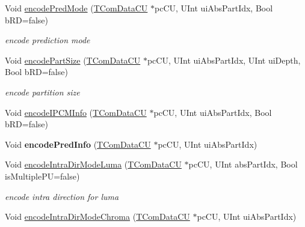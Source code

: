 \begin{DoxyCompactItemize}
\mbox{\label{class_t_enc_entropy_adc22243c038f82c46e56379d6cab5a7e}} 
Void \hyperlink{class_t_enc_entropy_adc22243c038f82c46e56379d6cab5a7e}{encode\+Pred\+Mode} (\hyperlink{class_t_com_data_c_u}{T\+Com\+Data\+CU} $\ast$pc\+CU, U\+Int ui\+Abs\+Part\+Idx, Bool b\+RD=false)
\begin{DoxyCompactList}\small\item\em encode prediction mode \end{DoxyCompactList}\item 
\mbox{\label{class_t_enc_entropy_a44ce8f77921ba342649fa33d359b47b6}} 
Void \hyperlink{class_t_enc_entropy_a44ce8f77921ba342649fa33d359b47b6}{encode\+Part\+Size} (\hyperlink{class_t_com_data_c_u}{T\+Com\+Data\+CU} $\ast$pc\+CU, U\+Int ui\+Abs\+Part\+Idx, U\+Int ui\+Depth, Bool b\+RD=false)
\begin{DoxyCompactList}\small\item\em encode partition size \end{DoxyCompactList}\item 
Void \hyperlink{class_t_enc_entropy_a9ae7bfe8ecc4a081b5ac6e62a5390f7e}{encode\+I\+P\+C\+M\+Info} (\hyperlink{class_t_com_data_c_u}{T\+Com\+Data\+CU} $\ast$pc\+CU, U\+Int ui\+Abs\+Part\+Idx, Bool b\+RD=false)
\item 
\mbox{\label{class_t_enc_entropy_ada3f8378520593c4a4a7707c95e7d5c2}} 
Void {\bfseries encode\+Pred\+Info} (\hyperlink{class_t_com_data_c_u}{T\+Com\+Data\+CU} $\ast$pc\+CU, U\+Int ui\+Abs\+Part\+Idx)
\item 
\mbox{\label{class_t_enc_entropy_a845df3e72b781a2f00c6015d0195360b}} 
Void \hyperlink{class_t_enc_entropy_a845df3e72b781a2f00c6015d0195360b}{encode\+Intra\+Dir\+Mode\+Luma} (\hyperlink{class_t_com_data_c_u}{T\+Com\+Data\+CU} $\ast$pc\+CU, U\+Int abs\+Part\+Idx, Bool is\+Multiple\+PU=false)
\begin{DoxyCompactList}\small\item\em encode intra direction for luma \end{DoxyCompactList}\item 
\mbox{\label{class_t_enc_entropy_ae8b36b7752a68751a7643418507ac42a}} 
Void \hyperlink{class_t_enc_entropy_ae8b36b7752a68751a7643418507ac42a}{encode\+Intra\+Dir\+Mode\+Chroma} (\hyperlink{class_t_com_data_c_u}{T\+Com\+Data\+CU} $\ast$pc\+CU, U\+Int ui\+Abs\+Part\+Idx)

\end{DoxyCompactItemize}
